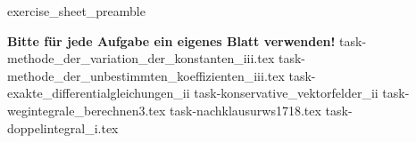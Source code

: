 \RequirePackage{import}
{exercise_sheet_preamble}
 \geometry{
 a4paper,
 left=20mm,
 right=20mm,
 top=20mm,
 bottom=20mm
 }

\renewcommand{\vec}[1]{\mathbf{#1}}
\noindent\textbf{Bitte für jede Aufgabe ein eigenes Blatt verwenden!}		
		{task-methode_der_variation_der_konstanten_iii.tex}
		{task-methode_der_unbestimmten_koeffizienten_iii.tex}
		{task-exakte_differentialgleichungen_ii}
			{task-konservative_vektorfelder_ii}\marginpar{5 Punkte}
				{task-wegintegrale_berechnen3.tex}
		{task-nachklausurws1718.tex}
		{task-doppelintegral_i.tex}

